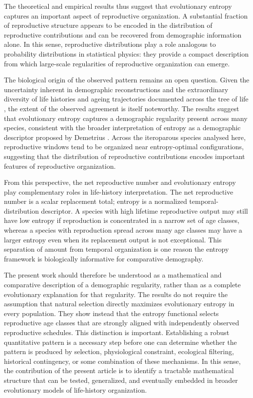 \documentclass[10pt,a4paper]{amsart}
\theoremstyle{definition}
\theoremstyle{remark}
\numberwithin{equation}{section}
\begin{document}
The theoretical and empirical results thus suggest that
evolutionary entropy captures an important aspect of reproductive
organization. A substantial fraction of reproductive structure
appears to be encoded in the distribution of reproductive
contributions and can be recovered from demographic information
alone. In this sense, reproductive distributions play a role
analogous to probability distributions in statistical physics:
they provide a compact description from which large-scale
regularities of reproductive organization can emerge.

The biological origin of the observed pattern remains an open
question. Given the uncertainty inherent in demographic
reconstructions
\cite{BuescuOliveiraSousa2023,Caswell,COMADRE,SalgueroGomez2016COMADRE}
and the extraordinary diversity of life histories and ageing
trajectories documented across the tree of life
\cite{Jones2014,Baudisch2008,deVries2023}, the extent of the observed
agreement is itself noteworthy. The results suggest that evolutionary
entropy captures a demographic regularity present across many
species, consistent with the broader interpretation of entropy as a
demographic descriptor proposed by Demetrius
\cite{Demetrius74,Demetrius75,Demetrius2004}. Across the iteroparous
species analysed here, reproductive windows tend to be organized near
entropy-optimal configurations, suggesting that the distribution of
reproductive contributions encodes important features of reproductive
organization.

From this perspective, the net reproductive number and evolutionary entropy play complementary roles in life-history interpretation. The net reproductive number is a scalar replacement total; entropy is a normalized temporal-distribution descriptor. A species with high lifetime reproductive output may still have low entropy if reproduction is concentrated in a narrow set of age classes, whereas a species with reproduction spread across many age classes may have a larger entropy even when its replacement output is not exceptional. This separation of amount from temporal organization is one reason the entropy framework is biologically informative for comparative demography.

The present work should therefore be understood as a mathematical and comparative description of a demographic regularity, rather than as a complete evolutionary explanation for that regularity. The results do not require the assumption that natural selection directly maximizes evolutionary entropy in every population. They show instead that the entropy functional selects reproductive age classes that are strongly aligned with independently observed reproductive schedules. This distinction is important. Establishing a robust quantitative pattern is a necessary step before one can determine whether the pattern is produced by selection, physiological constraint, ecological filtering, historical contingency, or some combination of these mechanisms. In this sense, the contribution of the present article is to identify a tractable mathematical structure that can be tested, generalized, and eventually embedded in broader evolutionary models of life-history organization.
\end{document}
